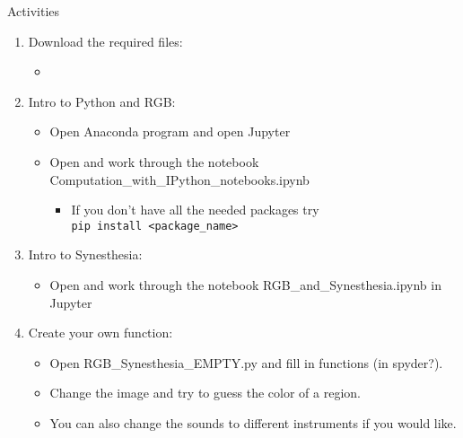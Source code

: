 \documentclass{beamer}
\newcommand{\red}[1]{{\color{red}{#1}}}
\begin{document}
\begin{frame}{Activities}
   \begin{enumerate}
      \item Download the required files:
      \begin{itemize}
         \item {\huge \red{Insert instructions here}}
      \end{itemize}
      \item Intro to Python and RGB:
      \begin{itemize}
         \item Open Anaconda program and open Jupyter
         \item Open and work through the notebook Computation\_with\_IPython\_notebooks.ipynb
         \begin{itemize}
            \item If you don't have all the needed packages try \\ \texttt{pip install <package\_name>}
         \end{itemize}
      \end{itemize}
      \item Intro to Synesthesia:
      \begin{itemize}
         \item Open and work through the notebook RGB\_and\_Synesthesia.ipynb in Jupyter
      \end{itemize}
      \item Create your own function:
      \begin{itemize}
         \item Open RGB\_Synesthesia\_EMPTY.py and fill in functions (in spyder?).
         \item Change the image and try to guess the color of a region.
         \item You can also change the sounds to different instruments if you would like.
      \end{itemize}
   \end{enumerate}
\end{frame}
\end{document}
